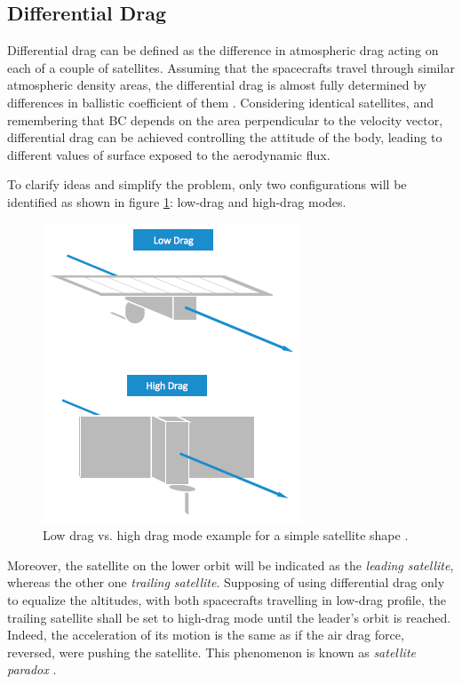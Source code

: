 \subsection{Differential Drag}
Differential drag can be defined as the difference in atmospheric drag acting on each of a couple of satellites.
Assuming that the spacecrafts travel through similar atmospheric density areas, the differential drag is almost fully determined by differences in ballistic coefficient of them \cite{leonard1991formationkeeping}.
Considering identical satellites, and remembering that BC depends on the area perpendicular to the velocity vector, differential drag can be achieved controlling the attitude of the body, leading to different values of surface exposed to the aerodynamic flux. 

To clarify ideas and simplify the problem, only two configurations will be identified as shown in figure \ref{low_vs_high_dragmode_fig}: low-drag and high-drag modes.
\begin{figure}[h]
    \centering
    \includegraphics[scale=1]{img/low_vs_high_dragmode.png}
    \caption{Low drag vs. high drag mode example for a simple satellite shape \cite{foster2018differential}.}
    \label{low_vs_high_dragmode_fig}
\end{figure}
Moreover, the satellite on the lower orbit will be indicated as the \textit{leading satellite}, whereas the other one \textit{trailing satellite}.
Supposing of using differential drag only to equalize the altitudes, with both spacecrafts travelling in low-drag profile, the trailing satellite shall be set to high-drag mode until the leader's orbit is reached.
Indeed, the acceleration of its motion is the same as if the air drag force, reversed, were pushing the satellite. 
This phenomenon is known as \textit{satellite paradox} \cite{mills1959satellite}. 

